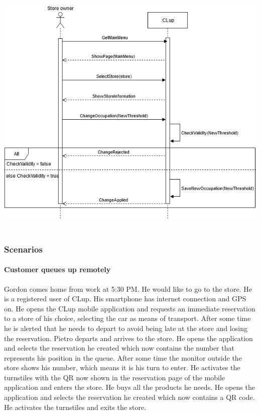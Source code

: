 \includegraphics[scale=0.5]{Images/UseCase9Diagram.png}\\\\
\subsubsection{Scenarios} %
\paragraph{Customer queues up remotely}
Gordon comes home from work at 5:30 PM. He would like to go to the store. He is a registered user of CLup. His smartphone has internet connection and GPS on. He opens the CLup mobile application and requests an immediate reservation to a store of his choice, selecting the car as means of transport. After some time he is alerted that he needs to depart to avoid being late at the store and losing the reservation. Pietro departs and arrives to the store. He opens the application and selects the reservation he created which now contains the number that represents his position in the queue. After some time the monitor outside the store shows his number, which means it is his turn to enter. He activates the turnstiles with the QR now shown in the reservation page of the mobile application and enters the store. He buys all the products he needs. He opens the application and selects the reservation he created which now contains a QR code. He activates the turnstiles and exits the store.
